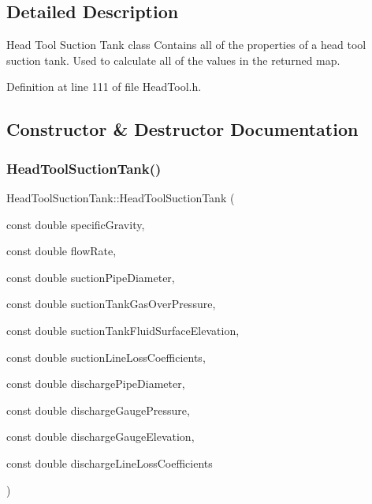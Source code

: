 \subsection{Detailed Description}
Head Tool Suction Tank class Contains all of the properties of a head tool suction tank. Used to calculate all of the values in the returned map. 

Definition at line 111 of file Head\+Tool.\+h.



\subsection{Constructor \& Destructor Documentation}
\mbox{\label{class_head_tool_suction_tank_a96579ecd414c723362db00cfeb24cd46}} 
\subsubsection{\texorpdfstring{Head\+Tool\+Suction\+Tank()}{HeadToolSuctionTank()}\hspace{0.1cm}{\footnotesize\ttfamily [1/3]}}
{\footnotesize\ttfamily Head\+Tool\+Suction\+Tank\+::\+Head\+Tool\+Suction\+Tank (\begin{DoxyParamCaption}\item[{const double}]{specific\+Gravity,  }\item[{const double}]{flow\+Rate,  }\item[{const double}]{suction\+Pipe\+Diameter,  }\item[{const double}]{suction\+Tank\+Gas\+Over\+Pressure,  }\item[{const double}]{suction\+Tank\+Fluid\+Surface\+Elevation,  }\item[{const double}]{suction\+Line\+Loss\+Coefficients,  }\item[{const double}]{discharge\+Pipe\+Diameter,  }\item[{const double}]{discharge\+Gauge\+Pressure,  }\item[{const double}]{discharge\+Gauge\+Elevation,  }\item[{const double}]{discharge\+Line\+Loss\+Coefficients }\end{DoxyParamCaption})\hspace{0.3cm}{\ttfamily [inline]}}

